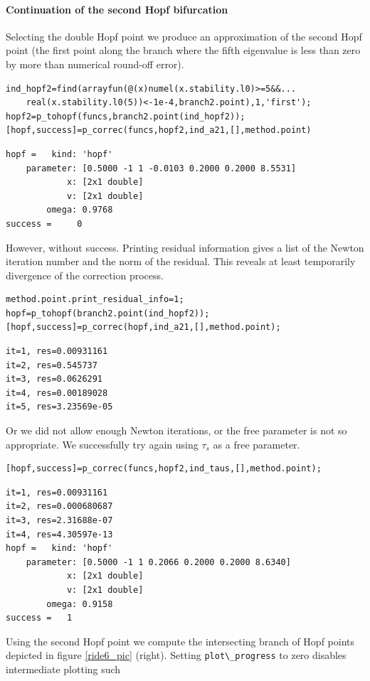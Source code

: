 \documentclass[10pt]{scrartcl}
\newcommand{\blist}[1]{\mbox{\lstinline!#1!}}
\begin{document}
\paragraph{Continuation of the second Hopf bifurcation}
Selecting the double Hopf point we produce an approximation of the
second Hopf point (the first point along the branch where the fifth
eigenvalue is less than zero by more than numerical round-off error).
\begin{lstlisting}
ind_hopf2=find(arrayfun(@(x)numel(x.stability.l0)>=5&&...
    real(x.stability.l0(5))<-1e-4,branch2.point),1,'first');
hopf2=p_tohopf(funcs,branch2.point(ind_hopf2));
[hopf,success]=p_correc(funcs,hopf2,ind_a21,[],method.point)  
\end{lstlisting} 
{\small
\begin{verbatim}
hopf =   kind: 'hopf'
    parameter: [0.5000 -1 1 -0.0103 0.2000 0.2000 8.5531]
            x: [2x1 double]
            v: [2x1 double]
        omega: 0.9768
success =     0
\end{verbatim}
} However, without success. Printing residual information gives a list
of the Newton iteration number and the norm of the residual. This
reveals at least temporarily divergence of the correction process.
\begin{lstlisting}
method.point.print_residual_info=1;
hopf=p_tohopf(branch2.point(ind_hopf2));
[hopf,success]=p_correc(hopf,ind_a21,[],method.point);
\end{lstlisting}
{\small
\begin{verbatim}
it=1, res=0.00931161
it=2, res=0.545737
it=3, res=0.0626291
it=4, res=0.00189028
it=5, res=3.23569e-05
\end{verbatim}
} Or we did not allow enough Newton iterations, or the free parameter
is not so appropriate.  We successfully try again using $\tau_s$ as a
free parameter.
\begin{lstlisting}
[hopf,success]=p_correc(funcs,hopf2,ind_taus,[],method.point);   
\end{lstlisting}
{\small
\begin{verbatim}
it=1, res=0.00931161
it=2, res=0.000680687
it=3, res=2.31688e-07
it=4, res=4.30597e-13
hopf =   kind: 'hopf'
    parameter: [0.5000 -1 1 0.2066 0.2000 0.2000 8.6340]
            x: [2x1 double]
            v: [2x1 double]
        omega: 0.9158
success =   1
\end{verbatim}
} Using the second Hopf point we compute the intersecting branch of
Hopf points depicted in figure \ref{ride6_pic} (right).  Setting
\blist{plot\_progress} to zero disables intermediate plotting such
\end{document}
